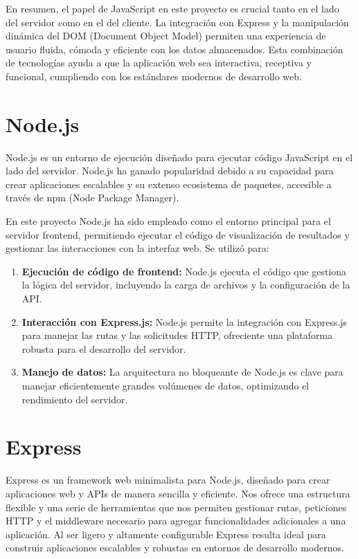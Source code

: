 \documentclass[a4paper, 12pt]{book}
\begin{document}
En resumen, el papel de JavaScript en este proyecto es crucial tanto en el lado del servidor como en el del cliente. La integración con Express y la manipulación dinámica del DOM (Document Object Model) permiten una experiencia de usuario fluida, cómoda y eficiente con los datos almacenados. Esta combinación de tecnologías ayuda a que la aplicación web sea interactiva, receptiva y funcional, cumpliendo con los estándares modernos de desarrollo web.

\section{Node.js}
Node.js \cite{casciaro_nodejs} es un entorno de ejecución diseñado para ejecutar código JavaScript en el lado del servidor. Node.js ha ganado popularidad debido a su capacidad para crear aplicaciones escalables y su extenso ecosistema de paquetes, accesible a través de npm (Node Package Manager).

En este proyecto Node.js ha sido empleado como el entorno principal para el servidor frontend, permitiendo ejecutar el código de visualización de resultados y gestionar las interacciones con la interfaz web. Se utilizó para:

\begin{enumerate}
    \item \textbf{Ejecución de código de frontend:} Node.js ejecuta el código que gestiona la lógica del servidor, incluyendo la carga de archivos y la configuración de la API.
    \item \textbf{Interacción con Express.js:} Node.js permite la integración con Express.js para manejar las rutas y las solicitudes HTTP, ofreciente una plataforma robusta para el desarrollo del servidor.
    \item \textbf{Manejo de datos:} La arquitectura no bloqueante de Node.js es clave para manejar eficientemente grandes volúmenes de datos, optimizando el rendimiento del servidor.
\end{enumerate}

\section{Express}
Express \cite{brown_node_express} es un framework web minimalista para Node.js, diseñado para crear aplicaciones web y APIs de manera sencilla y eficiente. Nos ofrece una estructura flexible y una serie de herramientas que nos permiten gestionar rutas, peticiones HTTP y el middleware necesario para agregar funcionalidades adicionales a una aplicación. Al ser ligero y altamente configurable Express resulta ideal para construir aplicaciones escalables y robustas en entornos de desarrollo modernos.
\end{document}

